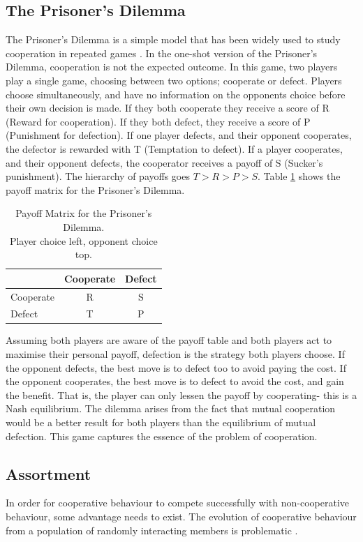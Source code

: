 \documentclass[a4paper,11pt]{article}
\begin{document}
\subsection{The Prisoner's Dilemma}
The Prisoner's Dilemma is a simple model that has been widely used to study cooperation in repeated games \citep{Axelrod1997}. 
In the one-shot version of the Prisoner's Dilemma, cooperation is not the expected outcome. 
In this game, two players play a single game, choosing between two options; cooperate or defect. 
Players choose simultaneously, and have no information on the opponents choice before their own decision is made. 
If they both cooperate they receive a score of R (Reward for cooperation). 
If they both defect, they receive a score of P (Punishment for defection). 
If one player defects, and their opponent cooperates, the defector is rewarded with T (Temptation to defect). 
If a player cooperates, and their opponent defects, the cooperator receives a payoff of S (Sucker's punishment). 
The hierarchy of payoffs goes $T>R>P>S$. Table \ref{table:payoffs} shows the payoff matrix for the Prisoner's Dilemma. 
\begin{table}[h]\centering
\captionsetup{justification=centering}
\begin{tabular}{|l|c|c|}
\hline
 & Cooperate & Defect\\
\hline
Cooperate & R & S\\
\hline
Defect & T  & P \\
\hline
\end{tabular}
\caption{Payoff Matrix for the Prisoner's Dilemma.\\ Player choice left, opponent choice top.}
\label{table:payoffs}
\end{table}

Assuming both players are aware of the payoff table and both players act to maximise their personal payoff, defection is the strategy both players choose. 
If the opponent defects, the best move is to defect too to avoid paying the cost. 
If the opponent cooperates, the best move is to defect to avoid the cost, and gain the benefit. 
That is, the player can only lessen the payoff by cooperating- this is a Nash equilibrium. 
The dilemma arises from the fact that mutual cooperation would be a better result for both players than the equilibrium of mutual defection. 
This game captures the essence of the problem of cooperation. %
\subsection{Assortment}
In order for cooperative behaviour to compete successfully with non-cooperative behaviour, some advantage needs to exist. 
The evolution of cooperative behaviour from a population of randomly interacting members is problematic \citep{axelrod:Science:1981}. 
\end{document}

